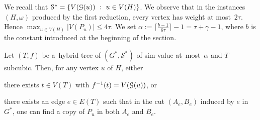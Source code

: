 \documentclass[a4paper,UKenglish,cleveref,hyperref,autoref]{lipics-v2021}
\renewcommand{\leq}{\leqslant}
\newcommand{\weight}{\omega}
\newcommand{\htree}{hybrid tree\xspace}
\begin{document}
We recall that $\mathcal S^* = \{V(\mathcal G(u))~:~u \in V(H)\}$.
We observe that in the instances $(H,\weight)$ produced by the first reduction, every vertex has weight at most~$2 \tau$.
Hence $\max_{u \in V(H)} |V(P_u)| \leq 4 \tau$.
We set $\alpha := \lceil \frac{b-1}{6 \tau} \rceil - 1 = \tau + \gamma - 1$, where $b$ is the constant introduced at the beginning of the section.

\begin{lemma}\label{lem:default-edge}
Let $(T, f)$ be a~\htree of $(G^*, \mathcal S^*)$ of sim-value at~most~$\alpha$ and $T$ subcubic.
Then, for any vertex $u$ of $H$, either
\begin{compactitem}
\item there exists $t \in V(T)$ with $f^{-1}(t) = V(\mathcal G(u))$, or
\item there exists an edge $e \in E(T)$ such that in the cut $(A_e, B_e)$ induced by $e$ in $G^*$, one can find a copy of $P_u$ in both $A_e$ and $B_e$.
\end{compactitem}
\end{lemma}
\end{document}
